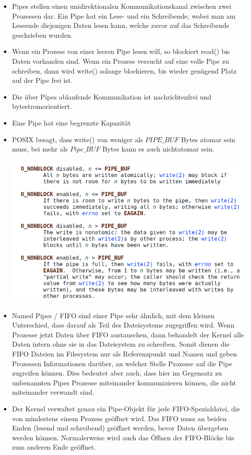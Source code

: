 \documentclass[a4paper]{article}
\begin{document}
\begin{itemize}
    \item Pipes stellen einen unidirektionalen Kommunikationskanal zwischen zwei Prozessen dar. Ein Pipe hat ein Lese- und ein Schreibende, wobei man am Leseende diejenigen Daten lesen kann, welche zuvor auf das Schreibende geschrieben wurden. 
    \item Wenn ein Prozess von einer leeren Pipe lesen will, so blockiert read() bis Daten vorhanden sind. Wenn ein Prozess versucht auf eine volle Pipe zu schreiben, dann wird write() solange blockieren, bis wieder genügend Platz auf der Pipe frei ist. 
    \item Die über Pipes ablaufende Kommunikation ist nachrichtenfrei und bytestromorientiert. 
    \item Eine Pipe hat eine begrenzte Kapazität
    \item POSIX besagt, dass write() von weniger als $PIPE\_BUF$ Bytes atomar sein muss, bei mehr als $Pipe\_BUF$ Bytes kann es auch nichtatomar sein. 
    \begin{center}
        \includegraphics[width=0.5\linewidth]{Assets/Betriebssysteme_uebung/u5_a5.png}
    \end{center}
    \item Named Pipes / FIFO sind einer Pipe sehr ähnlich, mit dem kleinen Unterschied, dass darauf als Teil des Dateisystems zugegriffen wird. Wenn Prozesse jetzt Daten über FIFO austauschen, dann behandelt der Kernel alle Daten intern ohne sie in das Dateisystem zu schreiben. Somit dienen die FIFO Dateien im Filesystem nur als Referenzpunkt und Namen und geben Prozessen Informationen darüber, an welcher Stelle Prozesse auf die Pipe zugreifen können. Dies bedeutet aber auch, dass hier im Gegensatz zu unbenannten Pipes Prozesse miteinander kommunizieren können, die nicht miteinander verwandt sind.
    \item Der Kernel verwaltet genau ein Pipe-Objekt für jede FIFO-Spezialdatei, die von mindestens einem Prozess geöffnet wird.  Das FIFO muss an beiden Enden (lesend und schreibend) geöffnet werden, bevor Daten übergeben werden können.  Normalerweise wird auch das Öffnen der FIFO-Blöcke bis zum anderen Ende geöffnet.
\end{itemize}
\end{document}
